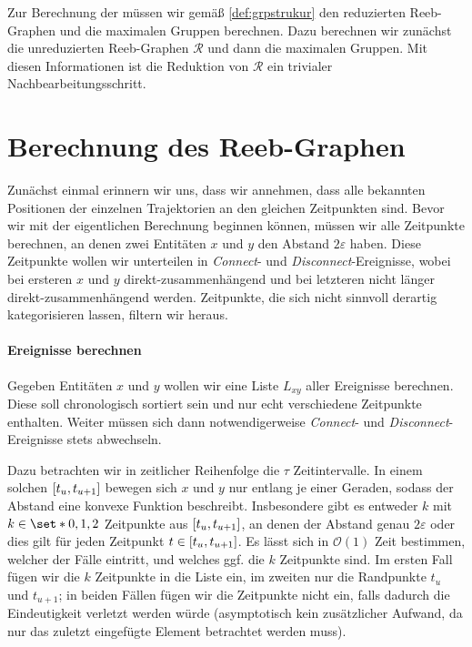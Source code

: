 Zur Berechnung der \GrpStruktur müssen wir gemäß \cref{def:grpstrukur} den reduzierten Reeb-Graphen und die maximalen Gruppen berechnen.
Dazu berechnen wir zunächst die unreduzierten Reeb-Graphen $\mathcal{R}$ und dann die maximalen Gruppen. 
Mit diesen Informationen ist die Reduktion von $\mathcal{R}$ ein trivialer Nachbearbeitungsschritt.

\section{Berechnung des Reeb-Graphen} %
\label{sec:berechnung_reeb}
Zunächst einmal erinnern wir uns, dass wir annehmen, dass alle bekannten Positionen der einzelnen Trajektorien an den gleichen Zeitpunkten sind.
Bevor wir mit der eigentlichen Berechnung beginnen können, müssen wir alle Zeitpunkte berechnen, an denen zwei Entitäten $x$ und $y$ den Abstand $2 \varepsilon$ haben.
Diese Zeitpunkte wollen wir unterteilen in \emph{Connect}- und \emph{Disconnect}-Ereignisse, wobei bei ersteren $x$ und $y$ direkt-zusammenhängend und bei letzteren nicht länger direkt-zusammenhängend werden.
Zeitpunkte, die sich nicht sinnvoll derartig kategorisieren lassen, filtern wir heraus.

\paragraph{Ereignisse berechnen} %
\label{par:ereignisse_berechnen}
Gegeben Entitäten $x$ und $y$ wollen wir eine Liste $L_{xy}$ aller Ereignisse berechnen.
Diese soll chronologisch sortiert sein und nur echt verschiedene Zeitpunkte enthalten.
Weiter müssen sich dann notwendigerweise \emph{Connect}- und \emph{Disconnect}-Ereignisse stets abwechseln.

Dazu betrachten wir in zeitlicher Reihenfolge die $\tau$ Zeitintervalle.
In einem solchen $\benbrace*{t_u,t_{u+1}}$ bewegen sich $x$ und $y$ nur entlang je einer Geraden, sodass der Abstand eine konvexe Funktion beschreibt.
Insbesondere gibt es entweder $k$ mit $k \in \set*{0,1,2}$ Zeitpunkte aus $\benbrace*{t_u,t_{u+1}}$, an denen der Abstand genau $2 \varepsilon$ oder dies gilt für jeden Zeitpunkt $t \in \benbrace*{t_u,t_{u+1}}$.
Es lässt sich in $\mathcal{O}(1)$ Zeit bestimmen, welcher der Fälle eintritt, und welches ggf. die $k$ Zeitpunkte sind.
Im ersten Fall fügen wir die $k$ Zeitpunkte in die Liste ein, im zweiten nur die Randpunkte $t_u$ und $t_{u+1}$; in beiden Fällen fügen wir die Zeitpunkte nicht ein, falls dadurch die Eindeutigkeit verletzt werden würde (asymptotisch kein zusätzlicher Aufwand, da nur das zuletzt eingefügte Element betrachtet werden muss).


